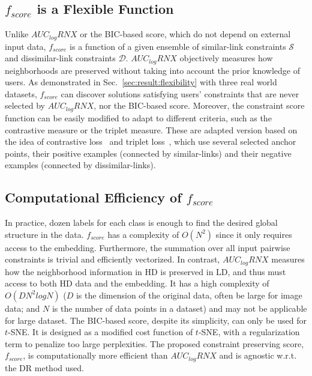 \subsection{$f_{score}$ is a Flexible Function}
Unlike $AUC_{log}RNX$ or the BIC-based score, which do not depend on external input data, $f_{score}$ is a function of a given ensemble of similar-link constraints $\mathcal{S}$ and dissimilar-link constraints $\mathcal{D}$.
$AUC_{log}RNX$ objectively measures how neighborhoods are preserved without taking into account the prior knowledge of users.
As demonstrated in Sec.~\ref{sec:result:flexibility} with three real world datasets, $f_{score}$ can discover solutions satisfying users' constraints that are never selected by $AUC_{log}RNX$, nor the BIC-based score.
Moreover, the constraint score function can be easily modified to adapt to different criteria, such as the contrastive measure or the triplet measure.
These are adapted version based on the idea of contrastive loss~\cite{logeswaran2018efficient} and triplet loss~\cite{schroff2015facenet}, which use several selected anchor points, their positive examples (connected by similar-links) and their negative examples (connected by dissimilar-links).

\subsection{Computational Efficiency of $f_{score}$}
In practice, dozen labels for each class is enough to find the desired global structure in the data.
$f_{score}$ has a complexity of $O(N^2)$ since it only requires access to the embedding.
Furthermore, the summation over all input pairwise constraints is trivial and efficiently vectorized.
In contrast, $AUC_{log}RNX$ measures how the neighborhood information in HD is preserved in LD, and thus must access to both HD data and the embedding.
It has a high complexity of $O(DN^2logN)$ ($D$ is the dimension of the original data, often be large for image data; and $N$ is the number of data points in a dataset) and may not be applicable for large dataset.
The BIC-based score, despite its simplicity, can only be used for $t$-SNE.
It is designed as a modified cost function of $t$-SNE, with a regularization term to penalize too large perplexities.
The proposed constraint preserving score, $f_{score}$, is computationally more efficient than $AUC_{log}RNX$ and is agnostic w.r.t. the DR method used.

